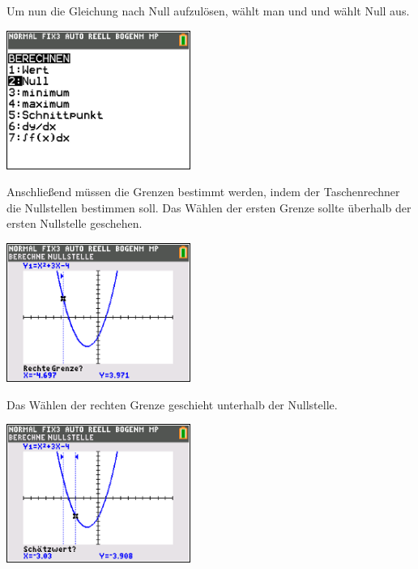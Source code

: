 \begin{paracol}{2}
	\begin{flushleft}
	Um nun die Gleichung nach Null aufzulösen, wählt man  und  und wählt Null aus.
		\end{flushleft}
\switchcolumn
	\begin{flushright}
	\includegraphics[width= 6cm]{Media/GRT/Visualisierung/loesen_gleichung/loesen_gleichung_2.png}
		\end{flushright}
\end{paracol}

\begin{paracol}{2}
	\begin{flushleft}
	Anschließend müssen die Grenzen bestimmt werden, indem der Taschenrechner die Nullstellen bestimmen soll. Das Wählen der ersten Grenze sollte überhalb der ersten Nullstelle geschehen.
		\end{flushleft}
\switchcolumn
	\begin{flushright}
	\includegraphics[width= 6cm]{Media/GRT/Visualisierung/loesen_gleichung/loesen_gleichung_3.png}
		\end{flushright}
\end{paracol}

\begin{paracol}{2}
	\begin{flushleft}
	Das Wählen der rechten Grenze geschieht unterhalb der Nullstelle.
		\end{flushleft}
\switchcolumn
	\begin{flushright}
	\includegraphics[width= 6cm]{Media/GRT/Visualisierung/loesen_gleichung/loesen_gleichung_4.png}
		\end{flushright}
\end{paracol}

